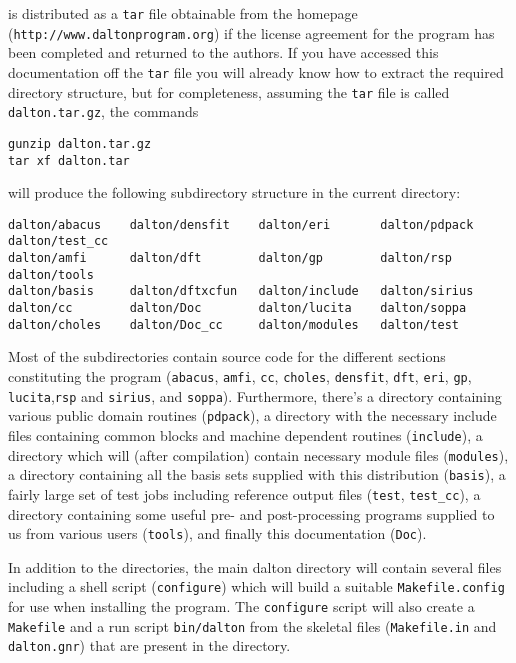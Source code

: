 {\dalton} is distributed as a \verb|tar| file obtainable from
the {\dalton} homepage\\
(\verb|http://www.daltonprogram.org|) if the
license agreement for the program has been completed and returned to
the authors.  If you have accessed this documentation off the
\verb|tar| file you will
already know how to extract the required directory structure, but
for completeness, assuming the \verb|tar| file is called
\verb|dalton.tar.gz|, the commands
\begin{verbatim}
gunzip dalton.tar.gz
tar xf dalton.tar
\end{verbatim}
will produce the following subdirectory structure in the current
directory:
\begin{verbatim}
dalton/abacus    dalton/densfit    dalton/eri       dalton/pdpack     dalton/test_cc
dalton/amfi      dalton/dft        dalton/gp        dalton/rsp        dalton/tools
dalton/basis     dalton/dftxcfun   dalton/include   dalton/sirius
dalton/cc        dalton/Doc        dalton/lucita    dalton/soppa
dalton/choles    dalton/Doc_cc     dalton/modules   dalton/test
\end{verbatim}
Most of the subdirectories contain source code for the different sections
constituting the program (\verb|abacus|, \verb|amfi|, \verb|cc|, \verb|choles|, \verb|densfit|,
\verb|dft|, \verb|eri|, \verb|gp|, \verb|lucita|,\verb|rsp| and \verb|sirius|, and \verb|soppa|). Furthermore,
there's a directory containing
various public domain routines (\verb|pdpack|), a directory with the
necessary include files containing common blocks and
machine dependent routines (\verb|include|), a directory 
which will (after compilation) contain necessary module files (\verb|modules|), 
a directory containing all the basis sets supplied with this distribution (\verb|basis|), a
fairly large set of test jobs including reference output files
(\verb|test|, \verb|test_cc|), a directory containing some useful pre- and
post-processing programs supplied to us from various users
(\verb|tools|), and finally this documentation (\verb|Doc|). 

In addition to the directories, the main dalton directory will
contain several files including a shell script (\verb|configure|)
which will build a suitable \verb|Makefile.config| for use when
installing the program. The \verb|configure| script will also create a
\verb|Makefile| and a run script \verb|bin/dalton| from the skeletal files
(\verb|Makefile.in| and \verb|dalton.gnr|) that are present in the
directory.



